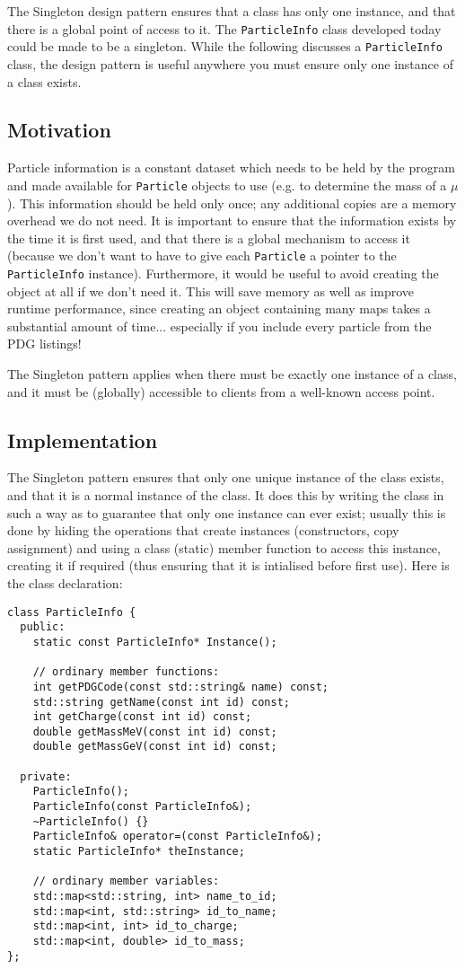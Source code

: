 \documentclass[a4paper]{scrartcl}
\begin{document}
The Singleton design pattern ensures that a class has only one instance, and that there is a global point of access to it. The \verb|ParticleInfo| class developed today could be made to be a singleton. While the following discusses a \verb|ParticleInfo| class, the design pattern is useful anywhere you must ensure only one instance of a class exists.

\subsection{Motivation}
Particle information is a constant dataset which needs to be held by the program and made available for \verb|Particle| objects to use (e.g. to determine the mass of a $\mu$). This information should be held only once; any additional copies are a memory overhead we do not need. It is important to ensure that the information exists by the time it is first used, and that there is a global mechanism to access it (because we don't want to have to give each \verb|Particle| a pointer to the \verb|ParticleInfo| instance). Furthermore, it would be useful to avoid creating the object at all if we don't need it. This will save memory as well as improve runtime performance, since creating an object containing many maps takes a substantial amount of time... especially if you include every particle from the PDG listings!

The Singleton pattern applies when there must be exactly one instance of a class, and it must be (globally) accessible to clients from a well-known access point.

\subsection{Implementation}
The Singleton pattern ensures that only one unique instance of the class exists, and that it is a normal instance of the class. It does this by writing the class in such a way as to guarantee that only one instance can ever exist; usually this is done by hiding the operations that create instances (constructors, copy assignment) and using a class (static) member function to access this instance, creating it if required (thus ensuring that it is intialised before first use). Here is the class declaration:

\begin{verbatim}
class ParticleInfo {
  public:
    static const ParticleInfo* Instance();

    // ordinary member functions:
    int getPDGCode(const std::string& name) const;
    std::string getName(const int id) const;
    int getCharge(const int id) const;
    double getMassMeV(const int id) const;
    double getMassGeV(const int id) const;

  private:
    ParticleInfo();
    ParticleInfo(const ParticleInfo&);
    ~ParticleInfo() {}
    ParticleInfo& operator=(const ParticleInfo&);
    static ParticleInfo* theInstance;

    // ordinary member variables:
    std::map<std::string, int> name_to_id;
    std::map<int, std::string> id_to_name;
    std::map<int, int> id_to_charge;
    std::map<int, double> id_to_mass;
};
\end{verbatim}
\end{document}
